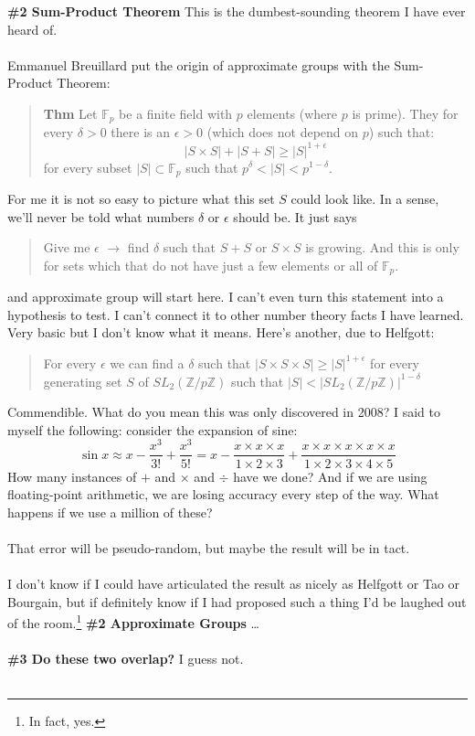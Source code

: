 \documentclass[12pt]{article}
\begin{document}
\textbf{\#2 Sum-Product Theorem}  This is the dumbest-sounding theorem I have ever heard of. \\ \\
Emmanuel Breuillard put the origin of approximate groups with the Sum-Product Theorem:
\begin{quotation}\noindent \textbf{\color{orange!60!red!20!white} Thm } 
{\color{orange!80!black}Let} $\mathbb{F}_p$ {\color{orange!80!black}be a finite field with} $p$ {\color{orange!80!black}elements (where }$p$ {\color{orange!80!black}is prime). They for every} $\delta > 0$ {\color{orange!80!black}there is an} $\epsilon > 0$ {\color{orange!80!black}(which does not depend on} $p${\color{orange!80!black}) such that:}
$$ |S \times S| + |S+S| \geq |S|^{1+\epsilon}  $$
{\color{orange!80!black}for every subset} $|S| \subset \mathbb{F}_p$ {\color{orange!80!black}such that }$p^\delta < |S| < p^{1-\delta}${\color{orange!80!black}.}
\end{quotation}
For me it is not so easy to picture what this set $S$ could look like.  In a sense, we'll never be told what numbers $\delta$ or $\epsilon$ should be.  It just says 
\begin{quotation} \noindent Give me $\epsilon$ $\to$  find $\delta$ such that $S+S$ or $S\times S$ is growing. And this is only for sets which that do not have just a few elements or all of $\mathbb{F}_p$.\end{quotation}
and approximate group will start here.  I can't even turn this statement into a hypothesis to test.  I can't connect it to other number theory facts I have learned.  Very basic but I don't know what it means.  Here's another, due to Helfgott:
\begin{quotation}\noindent 
For every $\epsilon$ we can find a $\delta$ such that $|S \times S \times S| \geq |S|^{1+\epsilon}$ for every generating set $S$ of $SL_2(\mathbb{Z}/p\mathbb{Z})$ such that $|S|< |SL_2(\mathbb{Z}/p\mathbb{Z})|^{1-\delta} $
\end{quotation} Commendible.  What do you mean this was only discovered in 2008?  I said to myself the following:  consider the expansion of sine:
$$ \sin x \approx x - \frac{x^3}{3!} + \frac{x^3}{5!} = 
x - \frac{x \times x \times x}{1 \times  2\times 3 } + \frac{x \times x \times x \times x \times x}{1 \times  2\times 3 \times 4 \times 5}$$
How many instances of $+$ and $\times$ and $\div$ have we done? And if we are using floating-point arithmetic, we are losing accuracy every step of the way.  What happens if we use a million of these?  \\\\
That error will be pseudo-random, but maybe the result will be in tact.  \\\\
I don't know if I could have articulated the result as nicely as Helfgott or Tao or Bourgain, but if definitely know if I had proposed such a thing I'd be laughed out of the room.\footnote{In fact, yes.}
\textbf{\#2 Approximate Groups} \dots \\ \\
\textbf{\#3 Do these two overlap?} I guess not. \\ \\
\end{document}
